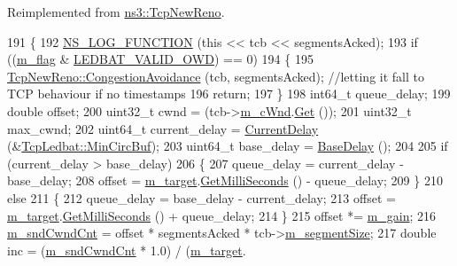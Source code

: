 Reimplemented from \hyperlink{classns3_1_1TcpNewReno_a34a5eec0649a7b485852c74c825e14ba}{ns3\+::\+Tcp\+New\+Reno}.


\begin{DoxyCode}
191 \{
192   \hyperlink{log-macros-disabled_8h_a90b90d5bad1f39cb1b64923ea94c0761}{NS\_LOG\_FUNCTION} (\textcolor{keyword}{this} << tcb << segmentsAcked);
193   \textcolor{keywordflow}{if} ((\hyperlink{classns3_1_1TcpLedbat_a2ff0d8e9f3fe47a1a589738f770ab00d}{m\_flag} & \hyperlink{classns3_1_1TcpLedbat_a03558d477638e07ba730413988f12d44a5465ff5c06920abd88c4c63e0e566039}{LEDBAT\_VALID\_OWD}) == 0)
194     \{
195       \hyperlink{classns3_1_1TcpNewReno_a34a5eec0649a7b485852c74c825e14ba}{TcpNewReno::CongestionAvoidance} (tcb, segmentsAcked); \textcolor{comment}{//letting it
       fall to TCP behaviour if no timestamps}
196       \textcolor{keywordflow}{return};
197     \}
198   int64\_t queue\_delay;
199   \textcolor{keywordtype}{double} offset;
200   uint32\_t cwnd = (tcb->\hyperlink{classns3_1_1TcpSocketState_a7cd3d2156a483c1db436097477a0fd7f}{m\_cWnd}.\hyperlink{classns3_1_1TracedValue_a10fddd1de961ac65acfbeb440a1e8551}{Get} ());
201   uint32\_t max\_cwnd;
202   uint64\_t current\_delay = \hyperlink{classns3_1_1TcpLedbat_af8d5dbf7a101ed4c1134132724094bde}{CurrentDelay} (&\hyperlink{classns3_1_1TcpLedbat_a5ee6ecafab7d35aa17569d75ddb513c8}{TcpLedbat::MinCircBuf});
203   uint64\_t base\_delay = \hyperlink{classns3_1_1TcpLedbat_a376576d38e2467910d33ce0f0ea6d4ec}{BaseDelay} ();
204 
205   \textcolor{keywordflow}{if} (current\_delay > base\_delay)
206     \{
207       queue\_delay = current\_delay - base\_delay;
208       offset = \hyperlink{classns3_1_1TcpLedbat_a93ab2886c4bbbcec5a6efd192c437fb7}{m\_target}.\hyperlink{classns3_1_1Time_aba3428a8b6c4c8d9014ce44145081f34}{GetMilliSeconds} () - queue\_delay;
209     \}
210   \textcolor{keywordflow}{else}
211     \{
212       queue\_delay = base\_delay - current\_delay;
213       offset = \hyperlink{classns3_1_1TcpLedbat_a93ab2886c4bbbcec5a6efd192c437fb7}{m\_target}.\hyperlink{classns3_1_1Time_aba3428a8b6c4c8d9014ce44145081f34}{GetMilliSeconds} () + queue\_delay;
214     \}
215   offset *= \hyperlink{classns3_1_1TcpLedbat_a41255ef3e04f7cc54c4634c3729da506}{m\_gain};
216   \hyperlink{classns3_1_1TcpLedbat_aad785b326c9667e16056ef4f23c12299}{m\_sndCwndCnt} = offset * segmentsAcked * tcb->\hyperlink{classns3_1_1TcpSocketState_a079872f7b0099ef5f3cab4ff47bd2edd}{m\_segmentSize};
217   \textcolor{keywordtype}{double} inc =  (\hyperlink{classns3_1_1TcpLedbat_aad785b326c9667e16056ef4f23c12299}{m\_sndCwndCnt} * 1.0) / (\hyperlink{classns3_1_1TcpLedbat_a93ab2886c4bbbcec5a6efd192c437fb7}{m\_target}.

\end{DoxyCode}
